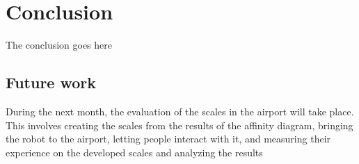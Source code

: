 \section{Conclusion}
\label{Conclusion}
%
The conclusion goes here

\subsection{Future work}
During the next month, the evaluation of the scales in the airport will take place. This involves creating the scales from the results of the affinity diagram, bringing the robot to the airport, letting people interact with it, and measuring their experience on the developed scales and analyzing the results